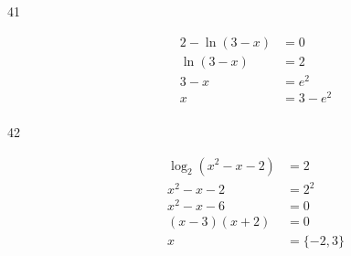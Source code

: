 \documentclass{exam}
\begin{document}
\begin{description}




      \item[41] 
        \begin{align*}
          2 - \ln(3 - x) &= 0 \\
          \ln(3 - x)     &= 2 \\
          3 - x          &= e^2 \\
          x              &= \boxed{3 - e^2} \\
        \end{align*}

      \item[42] 
        \begin{align*}
          \log_2(x^2 - x - 2) &= 2 \\
          x^2 - x - 2         &= 2^2 \\
          x^2 - x - 6         &= 0 \\
          (x - 3)(x + 2)      &= 0 \\
          x                   &= \boxed{\{ - 2, 3\}} \\
        \end{align*}


\end{description}
\end{document}
